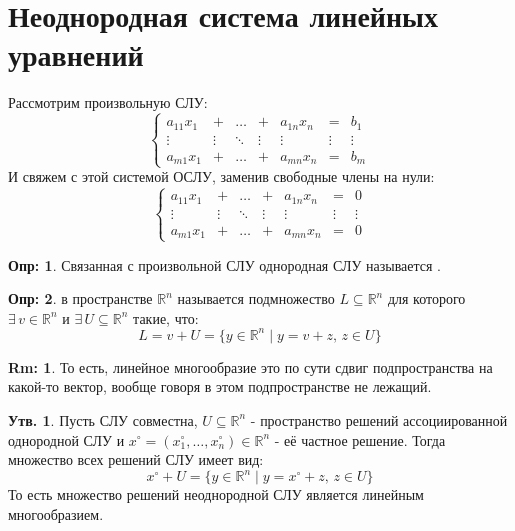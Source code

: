 \documentclass[12pt]{article}
\newcommand{\MR}{\mathbb{R}}
\theoremstyle{definition}
\newtheorem{defn}{Опр:}
\newtheorem{rem}{Rm:}
\newtheorem{prop}{Утв.}
\begin{document}
\section*{Неоднородная система линейных уравнений}
Рассмотрим произвольную СЛУ:
$$
	\left\{
	\begin{array}{ccccccc}
		a_{11}x_1 & + & \dotsc & + & a_{1n}x_n & = &  b_1\\
		\vdots  & \vdots & \ddots & \vdots & \vdots & \vdots & \vdots \\ 
		a_{m1}x_1 &  + & \dotsc & + & a_{mn}x_n & = & b_m
	\end{array}
	\right.
$$
И свяжем с этой системой ОСЛУ, заменив свободные члены на нули:
$$
	\left\{
	\begin{array}{ccccccc}
		a_{11}x_1 & + & \dotsc & + & a_{1n}x_n & = & 0\\
		\vdots  & \vdots & \ddots & \vdots & \vdots & \vdots & \vdots \\ 
		a_{m1}x_1 &  + & \dotsc & + & a_{mn}x_n & = & 0
	\end{array}
	\right.
$$
\begin{defn}
	Связанная с произвольной СЛУ однородная СЛУ называется .
\end{defn}
\begin{defn}
	 в пространстве $\MR^n$ называется подмножество $L \subseteq \MR^n$ для которого $\exists \, v \in \MR^n$ и $\exists \, U \subseteq \MR^n$ такие, что:
	$$
		L = v + U = \{y \in \MR^n \mid y = v + z, \, z \in U\}
	$$ 
\end{defn}
\begin{rem}
	То есть, линейное многообразие это по сути сдвиг подпространства на какой-то вектор, вообще говоря в этом подпространстве не лежащий.
\end{rem}
\begin{prop}
	Пусть СЛУ совместна, $U \subseteq \MR^n$ - пространство решений ассоциированной однородной СЛУ и $x^{\circ} = (x^{\circ}_1, \dotsc, x^{\circ}_n) \in \MR^n$ - её частное решение. Тогда множество всех решений СЛУ имеет вид: 
	$$
		x^{\circ} + U = \{y \in \MR^n \mid y = x^{\circ} + z, \, z \in U\}
	$$
	То есть множество решений неоднородной СЛУ является линейным многообразием.
\end{prop}
\end{document}
